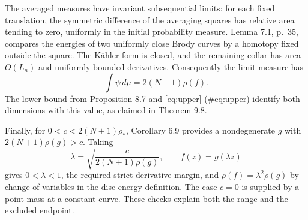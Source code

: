 \documentclass[10pt]{article}
\begin{document}
The averaged measures have invariant subsequential limits: for each fixed translation, the symmetric difference of the averaging squares has relative area tending to zero, uniformly in the initial probability measure. Lemma 7.1, p. 35, compares the energies of two uniformly close Brody curves by a homotopy fixed outside the square. The Kähler form is closed, and the remaining collar has area \(O(L_n)\) and uniformly bounded derivatives. Consequently the limit measure has \[\int\psi\,d\mu=2(N+1)\rho(f).\] The lower bound from Proposition 8.7 and [eq:upper] (\#eq:upper) identify both dimensions with this value, as claimed in Theorem 9.8.\par
Finally, for \(0<c<2(N+1)\rho_*\), Corollary 6.9 provides a nondegenerate \(g\) with \(2(N+1)\rho(g)>c\). Taking \[\lambda=\sqrt{\frac{c}{2(N+1)\rho(g)}},\qquad f(z)=g(\lambda z)\] gives \(0<\lambda<1\), the required strict derivative margin, and \(\rho(f)=\lambda^2\rho(g)\) by change of variables in the disc-energy definition. The case \(c=0\) is supplied by a point mass at a constant curve. These checks explain both the range and the excluded endpoint.\par
\end{document}

